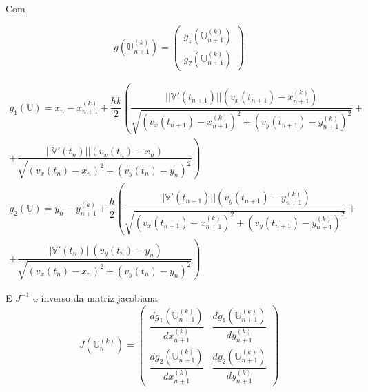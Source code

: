 \documentclass[a4paper,10pt]{article}
\begin{document}
  Com 
  
  \begin{equation}
   g(\mathbb{U}_{n+1}^{(k)}) = 
   \begin{pmatrix}
     g_{1}(\mathbb{U}_{n+1}^{(k)})
     \\
     g_{2}(\mathbb{U}_{n+1}^{(k)})
   \end{pmatrix}
  \end{equation}
  
  \begin{equation}
    \begin{split}
     g_{1}(\mathbb{U}) = x_{n} - x_{n+1}^{(k)} + \dfrac{hk}{2}\left(\dfrac{||\mathbb{V}'(t_{n+1})||(v_{x}(t_{n+1}) -x_{n+1}^{(k)})}{\sqrt{(v_{x}(t_{n+1}) - x_{n+1}^{(k)})^2 + (v_{y}(t_{n+1}) - y_{n+1}^{(k)})^2}}+\right.
     \\
     \left.
     + \dfrac{||\mathbb{V}'(t_{n})||(v_{x}(t_{n})-x_{n})}{\sqrt{(v_{x}(t_{n})-x_{n})^2 + (v_{y}(t_{n}) - y_{n})^2}}\right)
    \end{split}
   \end{equation}
   \begin{equation}
     \begin{split}
     g_{2}(\mathbb{U}) = y_{n} - y_{n+1}^{(k)} + \dfrac{h}{2}\left(\dfrac{||\mathbb{V}'(t_{n+1})||(v_{y}(t_{n+1}) -y_{n+1}^{(k)})}{\sqrt{(v_{x}(t_{n+1}) - x_{n+1}^{(k)})^2 + (v_{y}(t_{n+1}) - y_{n+1}^{(k)})^2}}+\right.
     \\
     \left.
     + \dfrac{||\mathbb{V}'(t_{n})||(v_{y}(t_{n})-y_{n})}{\sqrt{(v_{x}(t_{n})-x_{n})^2 + (v_{y}(t_{n}) - y_{n})^2}}\right)
     \end{split}
  \end{equation} 
  
  E $J^{-1}$ o inverso da matriz jacobiana $$J(\mathbb{U}_{n}^{(k)}) = 
  \begin{pmatrix}
    \dfrac{dg_{1}(\mathbb{U}_{n+1}^{(k)})}{dx_{n+1}^{(k)}} & \dfrac{dg_{1}(\mathbb{U}_{n+1}^{(k)})}{dy_{n+1}^{(k)}}
    \\
    \dfrac{dg_{2}(\mathbb{U}_{n+1}^{(k)})}{dx_{n+1}^{(k)}} & \dfrac{dg_{2}(\mathbb{U}_{n+1}^{(k)})}{dy_{n+1}^{(k)}}
  \end{pmatrix}$$
  
\end{document}
